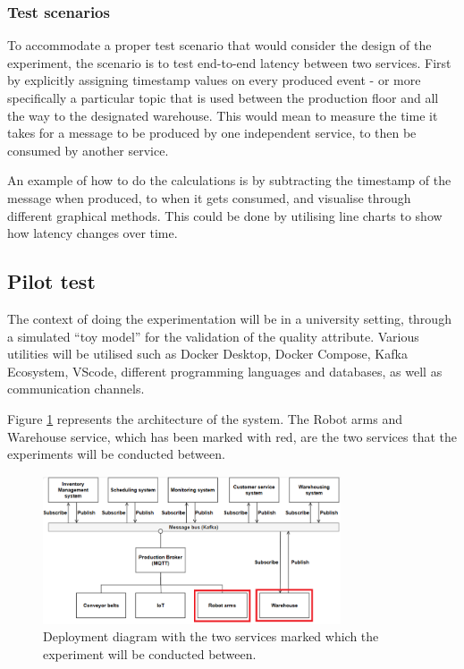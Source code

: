 \subsubsection{Test scenarios}
To accommodate a proper test scenario that would consider the design of the experiment, the scenario is to test end-to-end latency between two services. First by explicitly assigning timestamp values on every produced event - or more specifically a particular topic that is used between the production floor and all the way to the designated warehouse. This would mean to measure the time it takes for a message to be produced by one independent service, to then be consumed by another service.

An example of how to do the calculations is by subtracting the timestamp of the message when produced, to when it gets consumed, and visualise through different graphical methods. This could be done by utilising line charts to show how latency changes over time.

\subsection{Pilot test}
\label{sec:pilot_test}
The context of doing the experimentation will be in a university setting, through a simulated “toy model” for the validation of the quality attribute. Various utilities will be utilised such as Docker Desktop, Docker Compose, Kafka Ecosystem, VScode, different programming languages and databases, as well as communication channels. 

Figure \ref{fig:experiment-diagram} represents the architecture of the system. The Robot arms and Warehouse service, which has been marked with red, are the two services that the experiments will be conducted between.

\begin{figure}[!htb]
    \includegraphics[width=250pt]{images/experiment-diagram.png}
    \caption{Deployment diagram with the two services marked which the experiment will be conducted between.}
    \label{fig:experiment-diagram}
\end{figure}

